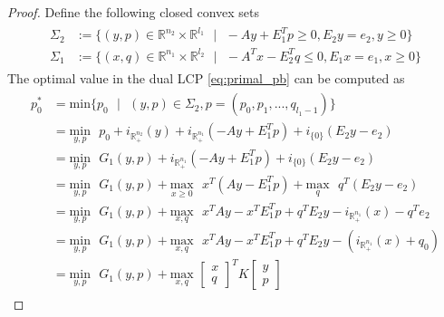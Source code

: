 \documentclass{article} %
\begin{document}
\begin{proof}
Define the following closed convex sets
\begin{eqnarray*}
  \begin{aligned}
  \Sigma_2 &:= \{(y, p) \in \mathbb{R}^{n_2} \times
  \mathbb{R}^{l_1}\text{ }|\text{ } -Ay + E_1^Tp \ge 0, E_2y = e_2, y
  \ge 0\}\\
  \Sigma_1 &:= \{(x, q) \in \mathbb{R}^{n_1} \times
  \mathbb{R}^{l_2}\text{ }|\text{ } -A^Tx - E_2^Tq \le 0, E_1x = e_1,
  x \ge 0\}
  \end{aligned}
\end{eqnarray*}
The optimal value in the dual LCP \eqref{eq:primal_pb} can be computed as 
\begin{eqnarray*}
  \begin{aligned}
    p_0^* &= \text{min}\{p_0\text{ }|\text{ } (y, p) \in \Sigma_2, p =
    (p_0, p_1, ..., q_{l_1-1})\}\\
    &= \underset{y,p}{\text{min}}\text{ }p_0 +
    i_{\mathbb{R}^{n_2}_+}(y) + i_{\mathbb{R}^{n_1}_+}(-Ay + E_1^Tp) +
    i_{\{0\}}(E_2y - e_2)\\
    &= \underset{y,p}{\text{min}}\text{ }G_1(y,p) +
    i_{\mathbb{R}^{n_1}_+}(-Ay + E_1^Tp) + i_{\{0\}}(E_2y - e_2)\\
    &= \underset{y,p}{\text{min}}\text{ }G_1(y,p) + \underset{x \geq
      0}{\text{max}}\text{ }x^T(Ay - E_1^Tp) +
    \underset{q}{\text{max}}\text{ }q^T(E_2y - e_2)\\
    &= \underset{y,p}{\text{min}}\text{ }G_1(y,p) + \underset{x,
      q}{\text{max}}\text{ }x^TAy - x^TE_1^Tp + q^TE_2y -
    i_{\mathbb{R}^{n_1}_+}(x) - q^Te_2\\
    &= \underset{y,p}{\text{min}}\text{ }G_1(y,p) + \underset{x,
      q}{\text{max}}\text{ }x^TAy - x^TE_1^Tp + q^TE_2y -
    (i_{\mathbb{R}^{n_1}_+}(x) + q_0)\\
    &= \underset{y,p}{\text{min}}\text{ }G_1(y,p) +
    \underset{x,q}{\text{max}}\text{
    }\begin{bmatrix}x\\q\end{bmatrix}^TK\begin{bmatrix}y\\p\end{bmatrix}

\end{aligned}
\end{eqnarray*}
\end{proof}
\end{document}
